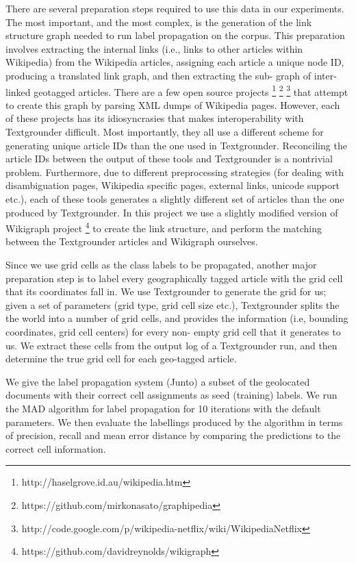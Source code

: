 \par There are several preparation steps required to use this data in our
experiments. The most important, and the most complex, is the generation of
the  link structure graph needed to run label propagation on the corpus. This
preparation involves extracting the internal links (i.e., links to other
articles within Wikipedia) from the Wikipedia articles, assigning each article
a unique node ID, producing a translated link graph, and then extracting the
sub- graph of inter-linked geotagged articles. There are a few open source
projects \footnote{http://haselgrove.id.au/wikipedia.htm}
\footnote{https://github.com/mirkonasato/graphipedia}
\footnote{http://code.google.com/p/wikipedia-netflix/wiki/WikipediaNetflix}
that attempt to create this graph by parsing XML dumps of Wikipedia pages.
However, each of these projects has its idiosyncrasies that makes
interoperability with Textgrounder difficult.  Most importantly, they all use
a different scheme for generating unique article IDs than the one used in
Textgrounder. Reconciling the article IDs between the output of these tools
and Textgrounder is a nontrivial problem. Furthermore, due to different
preprocessing strategies (for dealing with disambiguation pages, Wikipedia
specific pages, external links, unicode support etc.), each of these tools
generates a slightly different set of articles than the one produced by
Textgrounder. In this project we use a slightly modified version of Wikigraph
project \footnote{https://github.com/davidreynolds/wikigraph} to create the
link structure, and perform the matching between the Textgrounder articles and
Wikigraph ourselves.


\par Since we use grid cells as the class labels to be propagated,  another
major preparation step is to label every geographically tagged article  with
the grid cell that its coordinates fall in. We use Textgrounder to generate
the grid for us;  given a set of parameters (grid type, grid cell size etc.),
Textgrounder splits the the world into a number of grid cells, and provides
the information (i.e, bounding coordinates, grid cell centers) for every  non-
empty grid cell that it generates to us. We extract these cells from the
output  log of a Textgrounder run, and then determine the true grid cell for each geo-tagged article.


\par  We give the label propagation system (Junto) a subset of the geolocated
documents with their correct cell assignments as seed (training) labels. We
run the MAD algorithm for label propagation for 10 iterations with the default
parameters. We then evaluate the labellings produced by the algorithm in terms
of precision, recall and mean error distance by comparing the predictions to
the correct cell information.

